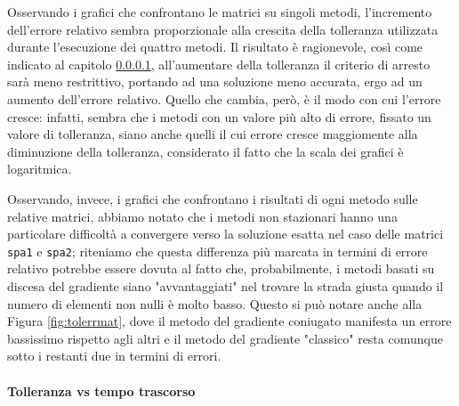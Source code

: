 Osservando i grafici che confrontano le matrici su singoli metodi, l'incremento dell'errore relativo sembra proporzionale alla crescita della tolleranza utilizzata durante l'esecuzione dei quattro metodi. Il risultato è ragionevole, così come indicato al capitolo \ref{tol/time, diff methods}, all'aumentare della tolleranza il criterio di arresto sarà meno restrittivo, portando ad una soluzione meno accurata, ergo ad un aumento dell'errore relativo. Quello che cambia, però, è il modo con cui l'errore cresce: infatti, sembra che i metodi con un valore più alto di errore, fissato un valore di tolleranza, siano anche quelli il cui errore cresce maggiomente alla diminuzione della tolleranza, considerato il fatto che la scala dei grafici è logaritmica.

Osservando, invece, i grafici che confrontano i risultati di ogni metodo sulle relative matrici, abbiamo notato che i metodi non stazionari hanno una particolare difficoltà a convergere verso la soluzione esatta nel caso delle matrici \texttt{spa1} e \texttt{spa2}; riteniamo che questa differenza più marcata in termini di errore relativo potrebbe essere dovuta al fatto che, probabilmente, i metodi basati su discesa del gradiente siano "avvantaggiati" nel trovare la strada giusta quando il numero di elementi non nulli è molto basso. Questo si può notare anche alla Figura \ref{fig:tolerrmat}, dove il metodo del gradiente coniugato manifesta un errore bassissimo rispetto agli altri e il metodo del gradiente "classico" resta comunque sotto i restanti due in termini di errori.

\paragraph{Tolleranza vs tempo trascorso}\label{tol/time, diff methods}


